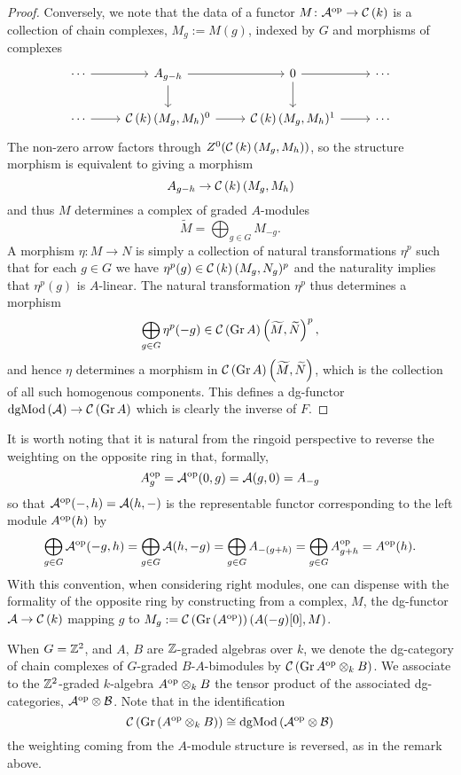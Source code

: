 \begin{lemma}
\begin{proof}
    Conversely, we note that the data of a functor \(M \colon \mathcal{A}^{\operatorname{op}} \to \mathcal{C}\left(k\right)\) is a collection of chain complexes, \(M_g := M(g)\), indexed by \(G\) and morphisms of complexes
    \[\begin{tikzcd}
    \cdots \arrow{r} & A_{g - h} \arrow{r}\arrow{d} & 0 \arrow{r}\arrow{d} & \cdots\\
    \cdots \arrow{r} & \CH{k}(M_g,M_h)^0 \arrow{r} & \CH{k}(M_g, M_h)^1 \arrow{r} & \cdots
    \end{tikzcd}\]    The non-zero arrow factors through \(Z^0(\mathcal{C}\left(k\right)(M_g, M_h))\), so the structure morphism is equivalent to giving a morphism
    \[A_{g - h} \to \mathcal{C}\left(k\right)(M_g,M_h)\]
    and thus \(M\) determines a complex of graded \(A\)-modules
    \[\widetilde{M} = \bigoplus_{g \in G}M_{-g}.\]
    A morphism \(\eta \colon M \to N\) is simply a collection of natural transformations \(\eta^p\) such that for each \(g \in G\) we have \(\eta^p(g) \in \mathcal{C}\left(k\right)(M_g,N_g)^p\) and the naturality implies that \(\eta^p(g)\) is \(A\)-linear.
    The natural transformation \(\eta^p\) thus determines a morphism
    \[\bigoplus_{g \in G} \eta^p(-g) \in \mathcal{C}\left(\operatorname{Gr}A\right)\left(\widetilde{M}, \widetilde{N}\right)^p,\]
    and hence \(\eta\) determines a morphism in \(\mathcal{C}\left(\operatorname{Gr}A\right)\left(\widetilde{M}, \widetilde{N}\right)\), which is the collection of all such homogenous components.
    This defines a dg-functor \(\operatorname{dgMod}\left(\mathcal{A}\right) \to \mathcal{C}\left(\operatorname{Gr}A\right)\) which is clearly the inverse of \(F\).
  \end{proof}
\end{lemma}

\begin{remark}
  It is worth noting that it is natural from the ringoid perspective to reverse the weighting on the opposite ring in that, formally,
  \[A^{\operatorname{op}}_{g} = \mathcal{A}^{\operatorname{op}}(0,g) = \mathcal{A}(g,0) = A_{-g}\]
  so that \(\mathcal{A}^{\operatorname{op}}(-, h) = \mathcal{A}(h,-)\) is the representable functor corresponding to the left module \(A^{\operatorname{op}}(h)\) by
  \[\bigoplus_{g \in G} \mathcal{A}^{\operatorname{op}}(-g,h) = \bigoplus_{g \in G} \mathcal{A}(h,-g) = \bigoplus_{g \in G} A_{-(g + h)} = \bigoplus_{g \in G} A^{\operatorname{op}}_{g + h} = A^{\operatorname{op}}(h).\]
  With this convention, when considering right modules, one can dispense with the formality of the opposite ring by constructing from a complex, \(M\), the dg-functor \(\mathcal{A} \to \mathcal{C}\left(k\right)\) mapping \(g\) to \(M_g := \mathcal{C}\left(\operatorname{Gr}\left(A^{{\operatorname{op}}}\right)\right)(A(-g)[0], M)\).
\end{remark}
When \(G = \mathbb{Z}^2\), and \(A\), \(B\) are \(\mathbb{Z}\)-graded algebras over \(k\), we denote the dg-category of chain complexes of \(G\)-graded \(B\)-\(A\)-bimodules by \(\mathcal{C}\left(\operatorname{Gr}A^{\operatorname{op}} \otimes_k B\right)\).
We associate to the \(\mathbb{Z}^2\)-graded \(k\)-algebra \(A^{\operatorname{op}} \otimes_k B\) the tensor product of the associated dg-categories, \(\mathcal{A}^{\operatorname{op}} \otimes \mathcal{B}\).
Note that in the identification
\[\mathcal{C}\left(\operatorname{Gr}\left(A^{\operatorname{op}} \otimes_k B\right)\right) \cong \operatorname{dgMod}\left(\mathcal{A}^{\operatorname{op}} \otimes \mathcal{B}\right)\]
the weighting coming from the \(A\)-module structure is reversed, as in the remark above.

